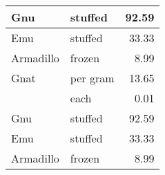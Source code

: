 {\begin{center}
\begin{xtabular}{llr}
\hline
{}Gnu       & stuffed  & 92.59 \\
\hline
{}Emu       & stuffed  & 33.33 \\
\hline
{}Armadillo & frozen   & 8.99  \\
\hline
{}Gnat      & per gram & 13.65 \\
\hline
{}          & each     & 0.01  \\
\hline
{}Gnu       & stuffed  & 92.59 \\
\hline
{}Emu       & stuffed  & 33.33 \\
\hline
{}Armadillo & frozen   & 8.99  \\
\end{xtabular}
\end{center}
} 
